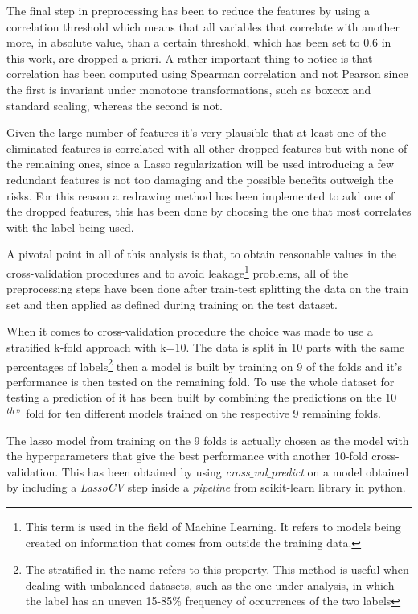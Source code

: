 The final step in preprocessing has been to reduce the features by using a correlation threshold which means that all variables that correlate with another more, in absolute value, than a certain threshold, which has been set to 0.6 in this work, are dropped a priori. A rather important thing to notice is that correlation has been computed using Spearman correlation and not Pearson since the first is invariant under monotone transformations, such as boxcox and standard scaling, whereas the second is not.

Given the large number of features it's very plausible that at least one of the eliminated features is correlated with all other dropped features but with none of the remaining ones, since a Lasso regularization will be used introducing a few redundant features is not too damaging and the possible benefits outweigh the risks. For this reason a redrawing method has been implemented to add one of the dropped features, this has been done by choosing the one that most correlates with the label being used.

A pivotal point in all of this analysis is that, to obtain reasonable values in the cross-validation procedures and to avoid leakage\footnote{This term is used in the field of Machine Learning. It refers to models being created on information that comes from outside the training data.} problems, all of the preprocessing steps have been done after train-test splitting the data on the train set and then applied as defined during training on the test dataset.

When it comes to cross-validation procedure the choice was made to use a stratified k-fold approach with k=10. The data is split in 10 parts with the same percentages of labels\footnote{The stratified in the name refers to this property. This method is useful when dealing with unbalanced datasets, such as the one under analysis, in which the label has an uneven 15-85$\%$ frequency of occurrences of the two labels} then a model is built by training on 9 of the folds and it's performance is then tested on the remaining fold. To use the whole dataset for testing a prediction of it has been built by combining the predictions on the 10$^{th}"$ fold for ten different models trained on the respective 9 remaining folds.

The lasso model from training on the 9 folds is actually chosen as the model with the hyperparameters that give the best performance with another 10-fold cross-validation. This has been obtained by using \textit{cross$\_$val$\_$predict} on a model obtained by including a \textit{LassoCV} step inside a \textit{pipeline} from scikit-learn library in python. 

